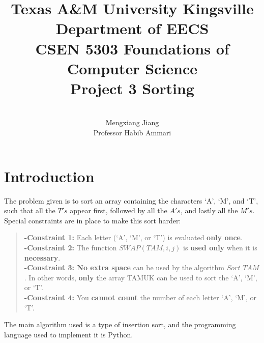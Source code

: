 \documentclass[12pt]{report}
\begin{document}
 
 
\title{Texas A\&M University Kingsville\\
Department of EECS\\
CSEN 5303 Foundations of Computer Science\\
Project 3 Sorting
}%
\author{\\
Mengxiang Jiang\\ %
Professor Habib Ammari} %
 
\maketitle

\tableofcontents

\chapter{Introduction}
The problem given is to sort an array containing the characters `A', `M', and `T',
 such that all the $T's$ appear first, followed by all the $A's$, and lastly all the $M's$.
Special constraints are in place to make this sort harder:
\begin{quote}
\textbf{-Constraint 1:} Each letter (`A', `M', or `T') is evaluated \textbf{only once}.\\
\textbf{-Constraint 2:} The function $SWAP(TAM,i,j)$ is \textbf{used only} when it is \textbf{necessary}.\\
\textbf{-Constraint 3: No extra space} can be used by the algorithm $Sort\_TAM$. In other words,
\textbf{only} the array TAMUK can be used to sort the `A', `M', or `T'.\\
\textbf{-Constraint 4:} You \textbf{cannot count} the number of each letter `A', `M', or `T'.
\end{quote}
The main algorithm used is a type of insertion sort, and the programming language used to implement it is Python.
\end{document}
